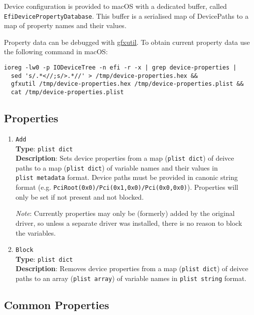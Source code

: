 \documentclass[]{article}
\makeatletter
\renewcommand{\label}[1]{%
\zref@wrapper@immediate{\oldlabel{#1}}}  %
\makeatother
\begin{document}
Device configuration is provided to macOS with a dedicated buffer,
called \texttt{EfiDevicePropertyDatabase}. This buffer is a serialised
map of DevicePaths to a map of property names and their values.

Property data can be debugged with
\href{https://github.com/acidanthera/gfxutil}{gfxutil}.
To obtain current property data use the following command in macOS:
\begin{lstlisting}[label=gfxutil, style=ocbash]
ioreg -lw0 -p IODeviceTree -n efi -r -x | grep device-properties |
  sed 's/.*<//;s/>.*//' > /tmp/device-properties.hex &&
  gfxutil /tmp/device-properties.hex /tmp/device-properties.plist &&
  cat /tmp/device-properties.plist
\end{lstlisting}

\subsection{Properties}\label{devpropsprops}

\begin{enumerate}
\item
  \texttt{Add}\\
  \textbf{Type}: \texttt{plist\ dict}\\
  \textbf{Description}: Sets device properties from a map (\texttt{plist\ dict})
  of deivce paths to a map (\texttt{plist\ dict}) of variable names and their values
  in \texttt{plist\ metadata} format. Device paths must be provided in canonic string
  format (e.g. \texttt{PciRoot(0x0)/Pci(0x1,0x0)/Pci(0x0,0x0)}). Properties will only
  be set if not present and not blocked.

  \emph{Note}: Currently properties may only be (formerly) added by the original driver,
  so unless a separate driver was installed, there is no reason to block the variables.

\item
  \texttt{Block}\\
  \textbf{Type}: \texttt{plist\ dict}\\
  \textbf{Description}: Removes device properties from a map (\texttt{plist\ dict})
  of deivce paths to an array (\texttt{plist\ array}) of variable names in
  \texttt{plist\ string} format.

\end{enumerate}

\subsection{Common Properties}\label{devpropscommon}
\end{document}
